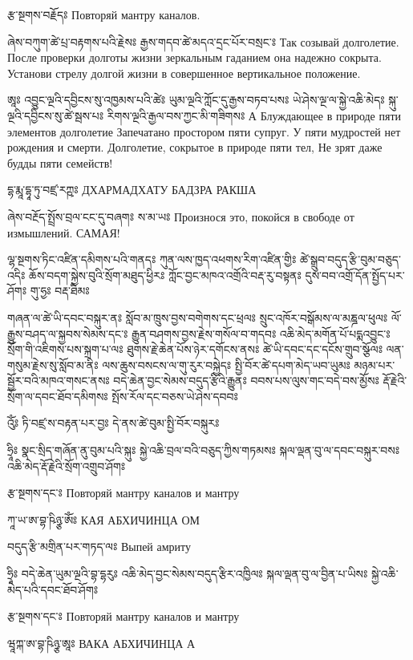 རྩ་སྔགས་བརྗོདཿ 
Повторяй мантру каналов.

ཞེས་བཀུག་ཚེ་པྲ་བརྟགས་པའི་རྗེསཿ  རྒྱས་གདབ་ཚེ་མདའ་དྲང་པོར་བསྲང་ཿ 
Так созывай долголетие. После проверки долготы жизни зеркальным гаданием она надежно сокрыта. Установи стрелу долгой жизни в совершенное вертикальное положение.

ཨཱཿ འབྱུང་ལྔའི་དབྱིངས་སུ་འཁྱམས་པའི་ཚེཿ 
ཡུམ་ལྔའི་ཀློང་དུ་རྒྱས་བཏབ་པསཿ 
ཡེ་ཤེས་ལྔ་ལ་སྐྱེ་འཆི་མེདཿ 
སྐུ་ལྔའི་དབྱིངས་སུ་ཚེ་སྦས་པཿ 
རིགས་ལྔའི་རྒྱལ་བས་ཀྱང་མི་གཟིགསཿ 
А  Блуждающее в природе пяти элементов долголетие
Запечатано простором пяти супруг.
У пяти мудростей нет рождения и смерти.
Долголетие, сокрытое в природе пяти тел,
Не зрят даже будды пяти семейств!

དྷ་རྨཱ་དྷཱ་ཏུ་བཛྲ་རཀྵཿ
ДХАРМАДХАТУ БАДЗРА РАКША

ཞེས་བརྔོད་སྤྲོས་བྲལ་ངང་དུ་བཞགཿ ས་མ་ཡཿ 
Произнося это, покойся в свободе от измышлений. САМАЯ! 

ལྷ་སྔགས་ཏིང་འཛིན་དམིགས་པའི་གནདཿ ཀུན་ལས་ཁྱད་འཕགས་རིག་འཛིན་གྱིཿ ཚེ་སྒྲུབ་བདུད་རྩི་བུམ་བཅུད་འདིཿ ཆོས་བདག་སྐྱེས་བུའི་སྲོག་མཐུད་ཕྱིརཿ ཀློང་བྱང་མཁའ་འགྲོའི་བརྡ་རུ་བསྟནཿ དུས་བབ་འགྲོ་དོན་སྤྱོད་པར་ཤོགཿ གུ་ཧྱཿ  བརྡ་ཐིམཿ 

གཞན་ལ་ཚེ་ཡི་དབང་བསྐུར་ནཿ སློབ་མ་ཁྲུས་བྱས་བགེགས་དང་ཕྲལཿ སྲུང་འཁོར་བསྒོམས་ལ་མཎྜལ་ཕུལཿ ལོ་རྒྱུས་བཤད་ལ་སྐྱབས་སེམས་དང་ཿ རྒྱུན་བཤགས་བྱས་རྗེས་གསོལ་བ་གདབཿ འཆི་མེད་མགོན་པོ་པདྨའབྱུང་ཿ སྲོག་གི་འཇིགས་པས་སྐྲག་པ་ལཿ ཐུགས་རྗེ་ཆེན་པོས་ཉེར་དགོངས་ནསཿ ཚེ་ཡི་དབང་དང་དངོས་གྲུབ་སྩོལཿ ལན་གསུམ་རྗེས་སུ་སློབ་མ་ནིཿ ལས་ཆུས་བསངས་ལ་གུ་རུར་བསྐྱེདཿ སྤྱི་བོར་ཚེ་དཔག་མེད་ཡབ་ཡུམཿ མཉམ་པར་སྦྱོར་བའི་མཁའ་གསང་ནསཿ བདེ་ཆེན་བྱང་སེམས་བདུད་རྩིའི་རྒྱུནཿ བབས་པས་ལུས་གང་བདེ་བས་མྱོསཿ རྡོ་རྗེའི་སྲོག་ལ་དབང་ཐོབ་དམིགསཿ སྤོས་རོལ་དང་བཅས་ཡེ་ཤེས་དབབཿ 

འོུཾཿ   ཏི་བཛྲ་ས་བརྟན་པར་བྱཿ དེ་ནས་ཚེ་བུམ་སྤྱི་བོར་བསྐུརཿ

ཧྲཱིཿ སྣང་སྲིད་གཞོན་ནུ་བུམ་པའི་སྐུཿ 
སྐྱེ་འཆི་བྲལ་བའི་བཅུད་ཀྱིས་གཏམསཿ 
སྐལ་ལྡན་བུ་ལ་དབང་བསྐུར་བསཿ 
འཆི་མེད་རྡོ་རྗེའི་སྲོག་འགྲུབ་ཤོགཿ 

རྩ་སྔགས་དང་ཿ 
Повторяй мантру каналов и мантру

ཀཱ་ཡ་ཨ་བྷ་ཥིཉྩ་ཨོཾཿ 
КАЯ АБХИЧИНЦА ОМ

བདུད་རྩི་མགྲིན་པར་གཏད་ལཿ 
Выпей амриту

ཧྲཱིཿ བདེ་ཆེན་ཡུམ་ལྔའི་བྷ་དྷརུཿ 
འཆི་མེད་བྱང་སེམས་བདུད་རྩིར་འཁྱིལཿ 
སྐལ་ལྡན་བུ་ལ་བྱིན་པ་ཡིསཿ 
སྐྱེ་འཆི་མེད་པའི་དབང་ཐོབ་ཤོགཿ 

རྩ་སྔགས་དང་ཿ 
Повторяй мантру каналов и мантру

ཝཱཀྐ་ཨ་བྷ་ཥིཉྩ་ཨཱཿ 
ВАКА АБХИЧИНЦА А

